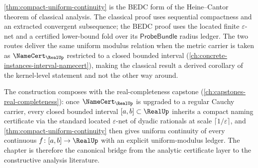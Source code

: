 \begin{remark}
\label{rem:compact-uniform-heine-cantor}
\autoref{thm:compact-uniform-continuity} is the BEDC form of the Heine--Cantor theorem of classical analysis. The classical proof uses sequential compactness and an extracted convergent subsequence; the BEDC proof uses the located finite $\varepsilon$-net and a certified lower-bound fold over its $\mathsf{ProbeBundle}$ radius ledger. The two routes deliver the same uniform modulus relation when the metric carrier is taken as $\NameCert_{\RealUp}$ restricted to a closed bounded interval (\autoref{ch:concrete-instances-interval-namecert}), making the classical result a derived corollary of the kernel-level statement and not the other way around.
\end{remark}

\begin{remark}
\label{rem:compact-uniform-real-completeness-composition}
The construction composes with the real-completeness capstone (\autoref{ch:capstones-real-completeness}): once $\NameCert_{\RealUp}$ is upgraded to a regular Cauchy carrier, every closed bounded interval $[a, b] \subset \RealUp$ inherits a compact naming certificate via the standard located $\varepsilon$-net of dyadic rationals at scale $\lceil 1/\varepsilon \rceil$, and \autoref{thm:compact-uniform-continuity} then gives uniform continuity of every continuous $f \colon [a, b] \to \RealUp$ with an explicit uniform-modulus ledger. The chapter is therefore the canonical bridge from the analytic certificate layer to the constructive analysis literature.
\end{remark}
